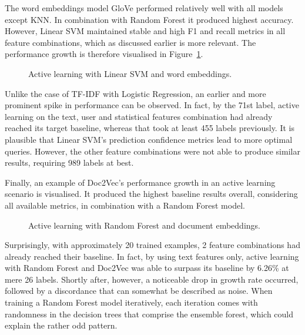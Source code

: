 \documentclass[a4paper,12pt]{article}
\begin{document}
The word embeddings model GloVe performed relatively well with all models except KNN. In combination with Random Forest it produced highest accuracy. However, Linear SVM maintained stable and high F1 and recall metrics in all feature combinations, which as discussed earlier is more relevant. The performance growth is therefore visualised in Figure~\ref{fig:lsvm-glove}.
\begin{figure}[H]
\captionsetup{justification=centering}
    \centering
    \scalebox{0.95}{}
    \caption{\label{fig:lsvm-glove}Active learning with Linear SVM and word embeddings.}
\end{figure}
Unlike the case of TF-IDF with Logistic Regression, an earlier and more prominent spike in performance can be observed. In fact, by the 71st label, active learning on the text, user and statistical features combination had already reached its target baseline, whereas that took at least 455 labels previously. It is plausible that Linear SVM's prediction confidence metrics lead to more optimal queries. However, the other feature combinations were not able to produce similar results, requiring 989 labels at best.

Finally, an example of Doc2Vec's performance growth in an active learning scenario is visualised. It produced the highest baseline results overall, considering all available metrics, in combination with a Random Forest model.
\begin{figure}[H]
\captionsetup{justification=centering}
    \centering
    \scalebox{0.95}{}
    \caption{\label{fig:rf-d2v}Active learning with Random Forest and document embeddings.}
\end{figure}
Surprisingly, with approximately 20 trained examples, 2 feature combinations had already reached their baseline. In fact, by using text features only, active learning with Random Forest and Doc2Vec was able to surpass its baseline by 6.26\% at mere 26 labels. Shortly after, however, a noticeable drop in growth rate occurred, followed by a discordance that can somewhat be described as noise. When training a Random Forest model iteratively, each iteration comes with randomness in the decision trees that comprise the ensemble forest, which could explain the rather odd pattern.
\end{document}
